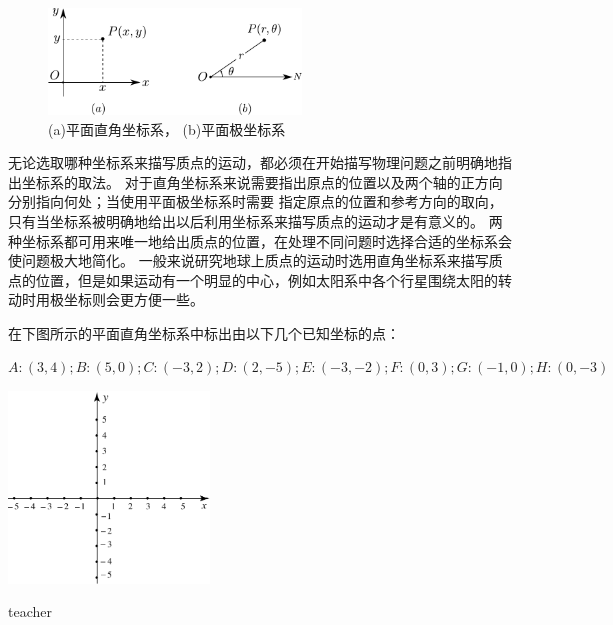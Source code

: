 \begin{figure}[hbtp]
\centering
\includegraphics[width=0.6\textwidth]{images/motion-theory-1.pdf}
\caption{(a)平面直角坐标系， (b)平面极坐标系}\label{fig: motion-两种坐标系}
\end{figure}

无论选取哪种坐标系来描写质点的运动，都必须在开始描写物理问题之前明确地指出坐标系的取法。
对于直角坐标系来说需要指出原点的位置以及两个轴的正方向分别指向何处；当使用平面极坐标系时需要 指定原点的位置和参考方向的取向，只有当坐标系被明确地给出以后利用坐标系来描写质点的运动才是有意义的。
两种坐标系都可用来唯一地给出质点的位置，在处理不同问题时选择合适的坐标系会使问题极大地简化。
一般来说研究地球上质点的运动时选用直角坐标系来描写质点的位置，但是如果运动有一个明显的中心，例如太阳系中各个行星围绕太阳的转动时用极坐标则会更方便一些。

\begin{example}
在下图所示的平面直角坐标系中标出由以下几个已知坐标的点：

$A:  (3,4); B: (5,0); C: (-3,2);  D: (2,-5); E: (-3,-2); F: (0, 3); G: (-1,0); H: (0,-3) $
\begin{center}
\includegraphics[width=0.4\textwidth]{images/motion-problem-7.pdf}
\end{center}

\begin{taggedblock}{teacher}


\end{taggedblock}
\end{example}

